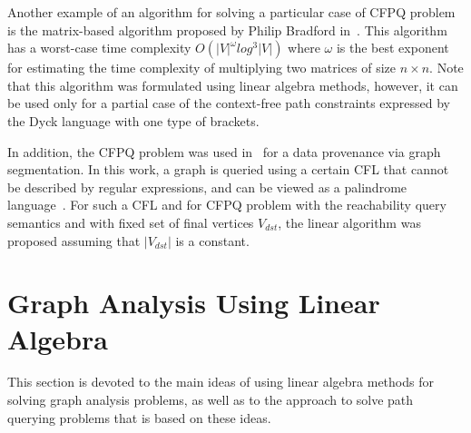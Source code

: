 Another example of an algorithm for solving a particular case of CFPQ problem is the matrix-based algorithm proposed by Philip Bradford in~\cite{bradford2017efficient}. This algorithm has a worst-case time complexity $O(|V|^{\omega} log^3 |V|)$ where $\omega$ is the best exponent for estimating the time complexity of multiplying two matrices of size $n \times n$. Note that this algorithm was formulated using linear algebra methods, however, it can be used only for a partial case of the context-free path constraints expressed by the Dyck language with one type of brackets.

In addition, the CFPQ problem was used in~\cite{miao2019understanding} for a data provenance via graph segmentation. In this work, a graph is queried using a certain CFL that cannot be described by regular expressions, and can be viewed as a palindrome language~\cite{hopcroft2001introduction}. For such a CFL and for CFPQ problem with the reachability query semantics and with fixed set of final vertices $V_{dst}$, the linear algorithm was proposed assuming that $|V_{dst}|$ is a constant.

\section{Graph Analysis Using Linear Algebra}\label{sec:ch1/sec6}
This section is devoted to the main ideas of using linear algebra methods for solving graph analysis problems, as well as to the approach to solve path querying problems that is based on these ideas.

